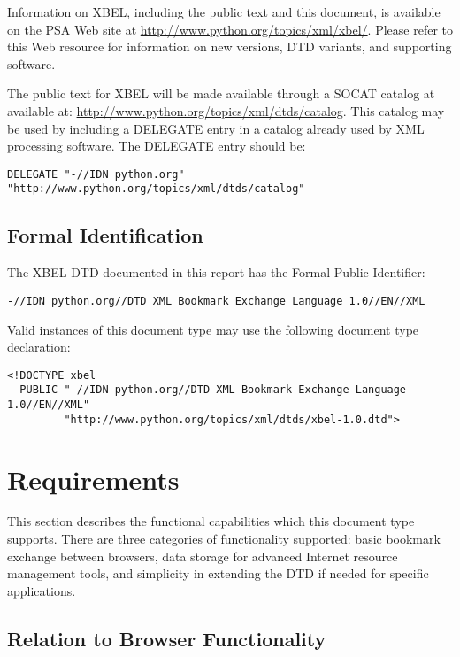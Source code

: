 \documentclass{howto}
\begin{document}
    Information on XBEL, including the public text and this document,
    is available on the PSA Web site at
    \url{http://www.python.org/topics/xml/xbel/}.  Please refer to
    this Web resource for information on new versions, DTD variants,
    and supporting software.

    The public text for XBEL will be made available through a SOCAT
    catalog at available at:
    \url{http://www.python.org/topics/xml/dtds/catalog}.  This catalog
    may be used by including a DELEGATE entry in a catalog already
    used by XML processing software.  The DELEGATE entry should be:

\begin{verbatim}
DELEGATE "-//IDN python.org" "http://www.python.org/topics/xml/dtds/catalog"
\end{verbatim}


  \subsection{Formal Identification
              \label{formal-ident}}

    The XBEL DTD documented in this report has the Formal Public
    Identifier:

\begin{verbatim}
-//IDN python.org//DTD XML Bookmark Exchange Language 1.0//EN//XML
\end{verbatim}

    Valid instances of this document type may use the following document
    type declaration:

\begin{verbatim}
<!DOCTYPE xbel
  PUBLIC "-//IDN python.org//DTD XML Bookmark Exchange Language 1.0//EN//XML"
         "http://www.python.org/topics/xml/dtds/xbel-1.0.dtd">
\end{verbatim}


\section{Requirements
         \label{requirements}}

  This section describes the functional capabilities which this
  document type supports.  There are three categories of
  functionality supported:  basic bookmark exchange between browsers,
  data storage for advanced Internet resource management tools, and
  simplicity in extending the DTD if needed for specific
  applications.

  \subsection{Relation to Browser Functionality
              \label{req-browser}}
\end{document}
